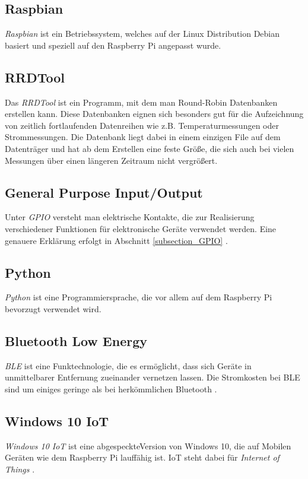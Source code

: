 \subsection*{Raspbian}
\textit{Raspbian} ist ein Betriebssystem, welches auf der Linux Distribution Debian basiert und speziell auf den Raspberry Pi angepasst wurde.

\subsection*{RRDTool}
Das \textit{RRDTool} ist ein Programm, mit dem man Round-Robin Datenbanken erstellen kann. Diese Datenbanken eignen sich besonders gut für die Aufzeichnung von zeitlich fortlaufenden Datenreihen wie z.B. Temperaturmessungen oder Strommessungen. Die Datenbank liegt dabei in einem einzigen File auf dem Datenträger und hat ab dem Erstellen eine feste Größe, die sich auch bei vielen Messungen über einen längeren Zeitraum nicht vergrößert. 

\subsection*{General Purpose Input/Output}
Unter \textit{\ac{GPIO}} versteht man elektrische Kontakte, die zur Realisierung verschiedener Funktionen für elektronische Geräte verwendet werden. Eine genauere Erklärung erfolgt in Abschnitt \ref{subsection_GPIO} \citep{Raspberri_Pi_Handbuch}.
\subsection*{Python}
\textit{Python} ist eine Programmiersprache, die vor allem auf dem Raspberry Pi bevorzugt verwendet wird.
\subsection*{Bluetooth Low Energy}
\textit{\ac{BLE}} ist eine Funktechnologie, die es ermöglicht, dass sich Geräte in unmittelbarer Entfernung zueinander vernetzen lassen. Die Stromkosten bei \ac{BLE} sind um einiges geringe als bei herkömmlichen Bluetooth \citep{Bluetooth_Low_Energy}.
\subsection*{Windows 10 IoT}
\textit{Windows 10 IoT} ist eine \glqq abgespeckte\grqq Version von Windows 10, die auf Mobilen Geräten wie dem Raspberry Pi lauffähig ist. IoT steht dabei für \textit{Internet of Things} \citep{Raspberri_Pi_Handbuch}.
